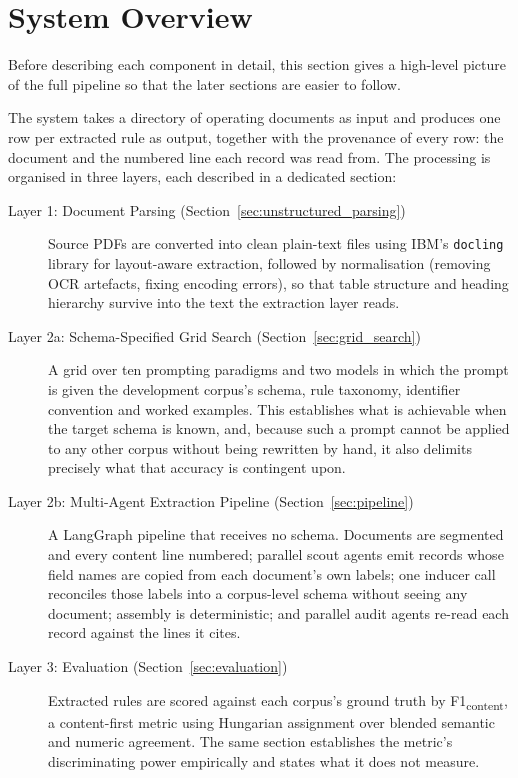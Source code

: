 \documentclass[11pt]{article}
\begin{document}
\section{System Overview}
\label{sec:overview}

Before describing each component in detail, this section gives a high-level
picture of the full pipeline so that the later sections are easier to follow.

The system takes a directory of operating documents as input and produces one
row per extracted rule as output, together with the provenance of every row:
the document and the numbered line each record was read from. The processing is
organised in three layers, each described in a dedicated section:

\begin{description}
    \item[Layer 1: Document Parsing (Section~\ref{sec:unstructured_parsing})]
          Source PDFs are converted into clean plain-text files using
          IBM's \texttt{docling} library for layout-aware extraction, followed
          by normalisation (removing OCR artefacts, fixing encoding errors),
          so that table structure and heading hierarchy survive into the text
          the extraction layer reads.

    \item[Layer 2a: Schema-Specified Grid Search (Section~\ref{sec:grid_search})]
          A grid over ten prompting paradigms and two models in which the prompt
          is given the development corpus's schema, rule taxonomy, identifier
          convention and worked examples. This establishes what is achievable
          when the target schema is known, and, because such a prompt cannot
          be applied to any other corpus without being rewritten by hand, it
          also delimits precisely what that accuracy is contingent upon.

    \item[Layer 2b: Multi-Agent Extraction Pipeline (Section~\ref{sec:pipeline})]
          A LangGraph pipeline that receives no schema. Documents are segmented
          and every content line numbered; parallel scout agents emit records
          whose field names are copied from each document's own labels; one
          inducer call reconciles those labels into a corpus-level schema
          without seeing any document; assembly is deterministic; and parallel
          audit agents re-read each record against the lines it cites.

    \item[Layer 3: Evaluation (Section~\ref{sec:evaluation})]
          Extracted rules are scored against each corpus's ground truth by
          F1\textsubscript{content}, a content-first metric using Hungarian
          assignment over blended semantic and numeric agreement. The same
          section establishes the metric's discriminating power empirically and
          states what it does not measure.
\end{description}
\end{document}
